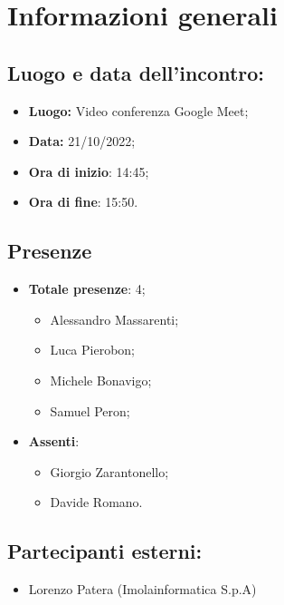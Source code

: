 \section{Informazioni generali}

\subsection{Luogo e data dell'incontro:}
\begin{itemize}
    \item \textbf{Luogo:} Video conferenza Google Meet;
    \item \textbf{Data:} 21/10/2022;
    \item \textbf{Ora di inizio}: 14:45;
    \item \textbf{Ora di fine}: 15:50.
\end{itemize}
\subsection{Presenze}
\begin{itemize}
    \item \textbf{Totale presenze}: 4;
    \begin{itemize}
        \item Alessandro Massarenti;
        \item Luca Pierobon;
        \item Michele Bonavigo;
        \item Samuel Peron;
    \end{itemize}
    \item \textbf{Assenti}:
    \begin{itemize}
        \item Giorgio Zarantonello;
        \item Davide Romano.
    \end{itemize}
\end{itemize}
\subsection{Partecipanti esterni:}
\begin{itemize}
    \item Lorenzo Patera (Imolainformatica S.p.A)
\end{itemize}